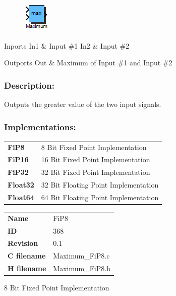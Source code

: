 \label{block:Maximum}
\begin{figure}[H]\includegraphics{Maximum}\end{figure} 

\begin{XtoCtabular}{Inports}
In1 & Input \#1\tabularnewline
\hline
In2 & Input \#2\tabularnewline
\hline
\end{XtoCtabular}


\begin{XtoCtabular}{Outports}
Out & Maximum of Input \#1 and Input \#2\tabularnewline
\hline
\end{XtoCtabular}

\subsubsection*{Description:}
Outputs the greater value of the two input signals.


\subsubsection*{Implementations:}
\begin{tabular}{l l}
\textbf{FiP8} & 8 Bit Fixed Point Implementation\tabularnewline
\textbf{FiP16} & 16 Bit Fixed Point Implementation\tabularnewline
\textbf{FiP32} & 32 Bit Fixed Point Implementation\tabularnewline
\textbf{Float32} & 32 Bit Floating Point Implementation\tabularnewline
\textbf{Float64} & 64 Bit Floating Point Implementation\tabularnewline
\end{tabular}

\nopagebreak[0]
\begin{tabular}{l l}
\textbf{Name} & FiP8 \tabularnewline
\textbf{ID} & 368 \tabularnewline
\textbf{Revision} & 0.1 \tabularnewline
\textbf{C filename} & Maximum\_FiP8.c \tabularnewline
\textbf{H filename} & Maximum\_FiP8.h \tabularnewline
\end{tabular}
\vspace{1ex}

8 Bit Fixed Point Implementation

